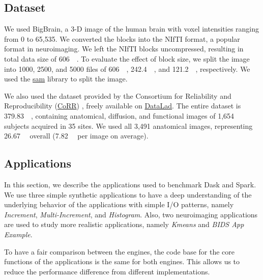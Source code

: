\documentclass[conference]{IEEEtran}
\begin{document}
\subsection{Dataset}
We used BigBrain\cite{Amunts:13}, a 3-D image of the human brain with voxel
intensities ranging from 0 to 65,535. We converted the blocks into the
NIfTI format, a popular format in neuroimaging. We left the NIfTI blocks
uncompressed, resulting in total data size of \SI{606}{\gibi\byte}. To
evaluate the effect of block size, we split the image into 1000, 2500,
and 5000 files of \SI{606}{\mebi\byte}, \SI{242.4}{\mebi\byte}, and
\SI{121.2}{\mebi\byte}, respectively.
We used the \href{https://github.com/big-data-lab-team/sam}{sam} library to split the image.
		
We also used the dataset provided by the Consortium for Reliability and
Reproducibility
(\href{http://fcon_1000.projects.nitrc.org/indi/CoRR/html/}{CoRR})
\cite{zuo2014open}, freely available on
\href{https://datasets.datalad.org/?dir=/corr/RawDataBIDS}{DataLad}.
The entire dataset is \SI{379.83}{\gibi\byte}, containing anatomical, diffusion,
and functional images of 1,654 subjects acquired in 35 sites.
We used all 3,491 anatomical images, representing \SI{26.67}{\gibi\byte} overall
(\SI{7.82}{\mebi\byte} per image on average).
		
\subsection{Applications}
In this section, we describe the applications used to benchmark Dask and Spark.
We use three simple synthetic applications to have a deep understanding of the 
underlying behavior of the applications with simple I/O patterns, namely
\textit{Increment}, \textit{Multi-Increment}, and \textit{Histogram}.
Also, two neuroimaging applications are used to study more realistic 
applications, namely \textit{Kmeans} and \textit{BIDS App Example}.
		
To have a fair comparison between the engines, the code base for the core functions of the applications is the same for both engines.
This allows us to reduce the performance difference from different implementations.
		
\end{document}
